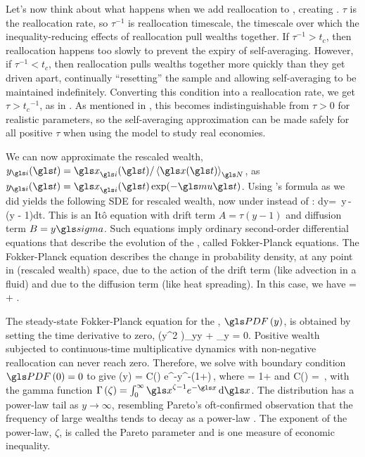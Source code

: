 Let's now think about what happens when we add reallocation to \GBM, creating \RGBM. $\tau$ is the reallocation rate, so $\tau^{-1}$ is reallocation timescale, \ie the timescale over which the inequality-reducing effects of reallocation pull wealths together. If $\tau^{-1}>t_c$, then reallocation happens too slowly to prevent the expiry of self-averaging. However, if $\tau^{-1}<t_c$, then reallocation pulls wealths together more quickly than they get driven apart, continually ``resetting'' the sample and allowing self-averaging to be maintained indefinitely. Converting this condition into a reallocation rate, we get $\tau>{t_c}^{-1}$, as in . As mentioned in , this becomes indistinguishable from $\tau>0$ for realistic parameters, so the self-averaging approximation can be made safely for all positive $\tau$ when using the model to study real economies.

We can now approximate the rescaled wealth, $y_\gi(\t)=\x_\gi(\t)/\ave{\x(\t)}_\N$, as $y_\gi(\t)=\x_\gi(\t)\exp(-\gmu \t)$. Using \Ito's formula as we did  yields the following SDE for rescaled wealth, now under \RGBM instead of \GBM:
\be
dy= \gsigma\,y\,\gd\gW - \tau\left(y - 1\right)dt.
\ee
This is an It\^o equation with drift term $A=\tau(y - 1)$ and diffusion term $B=y \gsigma$. Such equations imply ordinary second-order differential equations that describe the evolution of the \PDFa, called Fokker-Planck equations. The Fokker-Planck equation describes the change in probability density, at any point in (rescaled wealth) space, due to the action of the drift term (like advection in a fluid) and due to the diffusion term (like heat spreading). In this case, we have
\be
{}= + .
\ee

The steady-state Fokker-Planck equation for the \PDFa, $\PDF\left(y\right)$, is obtained by setting the time derivative to zero,
\be
{}\left(y^2 \PDF\right)_{yy} + \tau{}_y = 0.
\ee
Positive wealth subjected to continuous-time multiplicative dynamics with non-negative reallocation can never reach zero. Therefore, we solve  with boundary condition $\PDF\left(0\right)=0$ to give
\be
\PDF\left(y\right) = C\left(\zeta\right) e^{-}y^{-\left(1+\zeta\right)}\,,
\ee
where 
\be
\zeta = 1+
\ee
and
\be
C\left(\zeta\right) = \frac{\left(\zeta -1\right)^\zeta}{\Gamma \left(\zeta \right)}\,,
\ee
with the gamma function $\Gamma\left(\zeta\right) = \int_0^\infty \x^{\zeta-1} e^{-\x}\,\mathrm{d}\x$. The distribution has a power-law tail as $y\to\infty$, resembling Pareto's oft-confirmed observation that the frequency of large wealths tends to decay as a power-law \cite{Pareto1897}. The exponent of the power-law, $\zeta$, is called the Pareto parameter and is one measure of economic inequality.

